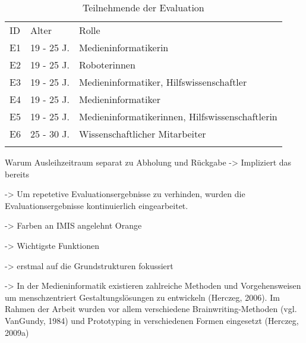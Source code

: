 \begin{table}[h]
    \centering
    \caption{Teilnehmende der Evaluation}
    \begin{tabular}{lll}
            \arrayrulecolor{maincolor}\hline
            \sffamily\color{maincolor}ID & \sffamily\color{maincolor}Alter &
            \sffamily\color{maincolor}Rolle \\
            \arrayrulecolor{maincolor}\hline
            E1                           & 19 - 25 J.                      &
            Medieninformatikerin                     \\
            E2                           & 19 - 25 J.                      & Roboterinnen \\
            E3                           & 19 - 25 J.                      & Medieninformatiker, Hilfswissenschaftler        \\
            E4                          & 19 - 25 J.                      & Medieninformatiker \\
            E5                           & 19 - 25 J.                      &
            Medieninformatikerinnen, Hilfswissenschaftlerin \\
            E6                           & 25 - 30 J.                      & Wissenschaftlicher Mitarbeiter        \\
            \arrayrulecolor{maincolor}\hline
    \end{tabular}
    \label{table:e}
\end{table}





Warum Ausleihzeitraum separat zu Abholung und Rückgabe -> Impliziert das bereits

-> Um repetetive Evaluationsergebnisse zu verhinden, wurden die
Evaluationsergebnisse kontinuierlich eingearbeitet.

-> Farben an IMIS angelehnt Orange

-> Wichtigste Funktionen 

-> erstmal auf die Grundstrukturen fokussiert 

-> In der Medieninformatik existieren zahlreiche Methoden und Vorgehensweisen um menschzentriert
Gestaltungslösungen zu entwickeln (Herczeg, 2006). Im Rahmen der Arbeit wurden vor allem
verschiedene Brainwriting-Methoden (vgl. VanGundy, 1984) und Prototyping in verschiedenen Formen
eingesetzt (Herczeg, 2009a)
